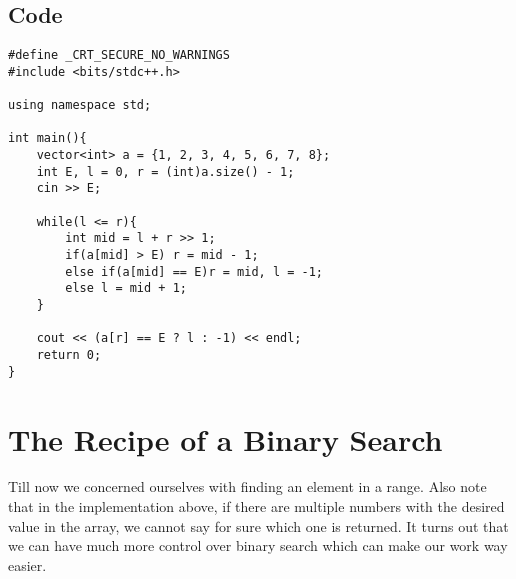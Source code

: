 \documentclass[12pt]{article}
\begin{document}
\begin{large}
\subsection{Code}
\begin{verbatim}
#define _CRT_SECURE_NO_WARNINGS
#include <bits/stdc++.h>

using namespace std;

int main(){
	vector<int> a = {1, 2, 3, 4, 5, 6, 7, 8}; 
	int E, l = 0, r = (int)a.size() - 1;
	cin >> E;
	
	while(l <= r){
		int mid = l + r >> 1; 
		if(a[mid] > E) r = mid - 1; 
		else if(a[mid] == E)r = mid, l = -1; 
		else l = mid + 1; 
	}
	
	cout << (a[r] == E ? l : -1) << endl; 
	return 0;  
}
\end{verbatim}
\section{The Recipe of a Binary Search}


Till now we concerned ourselves with finding an element in a range.
Also note that in the implementation above, if there are multiple numbers with the desired value in the array, we cannot say for sure which one is returned. It turns out that we can have much more control over binary search which can make our work way easier.

\end{large}
\end{document}
